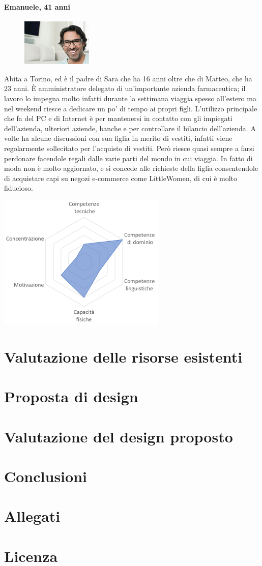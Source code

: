 \documentclass[12pt,a4paper]{report}
\begin{document}
\subsubsection*{Emanuele, 41 anni}
\begin{figure}
  \centering
    \includegraphics[width=0.3\textwidth]{"Images Latex/Personas/Emanuele"}
\end{figure}
Abita a Torino, ed è il padre di Sara che ha 16 anni oltre che di Matteo, che ha 23 anni. È amministratore delegato di un'importante azienda farmaceutica; il lavoro lo impegna molto infatti durante la settimana viaggia spesso all'estero ma nel weekend riesce a dedicare un po' di tempo ai propri figli. L’utilizzo principale che fa del PC e di Internet è per mantenersi in contatto con gli impiegati dell'azienda, ulteriori aziende, banche e per controllare il bilancio dell’azienda. A volte ha alcune discussioni con sua figlia in merito di vestiti, infatti viene regolarmente sollecitato per l’acquisto di vestiti. Però riesce quasi sempre a farsi perdonare facendole regali dalle varie parti del mondo in cui viaggia. In fatto di moda non è molto aggiornato, e si concede alle richieste della figlia consentendole di acquistare capi su negozi e-commerce come LittleWomen, di cui è molto fiducioso.
\begin{center}
  \includegraphics[width=0.6\textwidth]{"Images Latex/Personas/Emanuele41"}
\end{center}
\newpage

\chapter{Valutazione delle risorse esistenti}
\chapter{Proposta di design}
\chapter{Valutazione del design proposto}
\chapter{Conclusioni}
\chapter{Allegati}
\chapter{Licenza}
\end{document}
